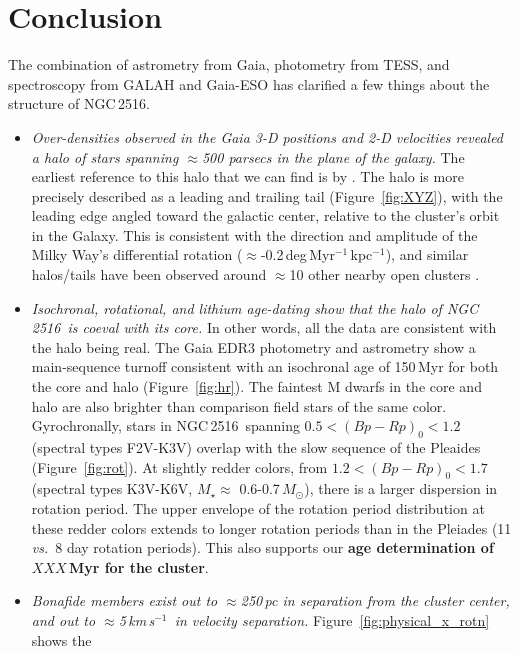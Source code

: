 \documentclass[12pt,twocolumn,tighten]{aastex63}
\newcommand{\cn}{NGC\,2516} %
\newcommand{\kms}{\,km\,s$^{-1}$}
\begin{document}
\section{Conclusion}
\label{sec:conclusion}

The combination of astrometry from Gaia, photometry from TESS, and
spectroscopy from GALAH and Gaia-ESO has clarified a few things about
the structure of \cn.
\begin{itemize}
  \item {\it Over-densities observed in the Gaia 3-D positions and 2-D
    velocities revealed a halo of stars spanning $\approx$500 parsecs
    in the plane of the galaxy.} The earliest reference to this halo
    that we can find is by \citet{kounkel_untangling_2019}.  The halo
    is more precisely described as a leading and trailing tail
    (Figure~\ref{fig:XYZ}), with the leading edge angled toward the
    galactic center, relative to the cluster's orbit in the Galaxy.
    This is consistent with the direction and amplitude of the Milky
    Way's differential rotation
    ($\approx$-0.2\,deg\,Myr$^{-1}$\,kpc$^{-1}$), and similar
    halos/tails have been observed around $\approx$10 other nearby
    open clusters \citep{meingast_2021}.
  \item {\it Isochronal, rotational, and lithium age-dating show that
    the halo of \cn\ is coeval with its core.} In other words, all
    the data are consistent with the halo being real.  The Gaia EDR3
    photometry and astrometry show a main-sequence turnoff consistent
    with an isochronal age of 150\,Myr for both the core and halo
    (Figure~\ref{fig:hr}).  The faintest M dwarfs in the core and halo
    are also brighter than comparison field stars of the same color.
    Gyrochronally, stars in \cn\ spanning $0.5<(Bp-Rp)_0<1.2$
    (spectral types F2V-K3V) overlap with the slow sequence of the
    Pleaides (Figure~\ref{fig:rot}).  At slightly redder
    colors, from $1.2<(Bp-Rp)_0<1.7$ (spectral types K3V-K6V,
    $M_\star$$\approx$ 0.6-0.7\,$M_\odot$), there is a larger
    dispersion in rotation period.  The upper envelope of the rotation
    period distribution at these redder colors extends to
    longer rotation periods than in the Pleiades (11 {\it
    vs.}\ 8 day rotation periods).
    This also supports our {\bf age determination of $XXX$\,Myr for
    the cluster}.
  \item {\it Bonafide members exist out to $\approx$250\,pc in
    separation from the cluster center, and out to $\approx$5\kms\ in
    velocity separation.} Figure~\ref{fig:physical_x_rotn} shows the
$$
\end{itemize}
\end{document}
